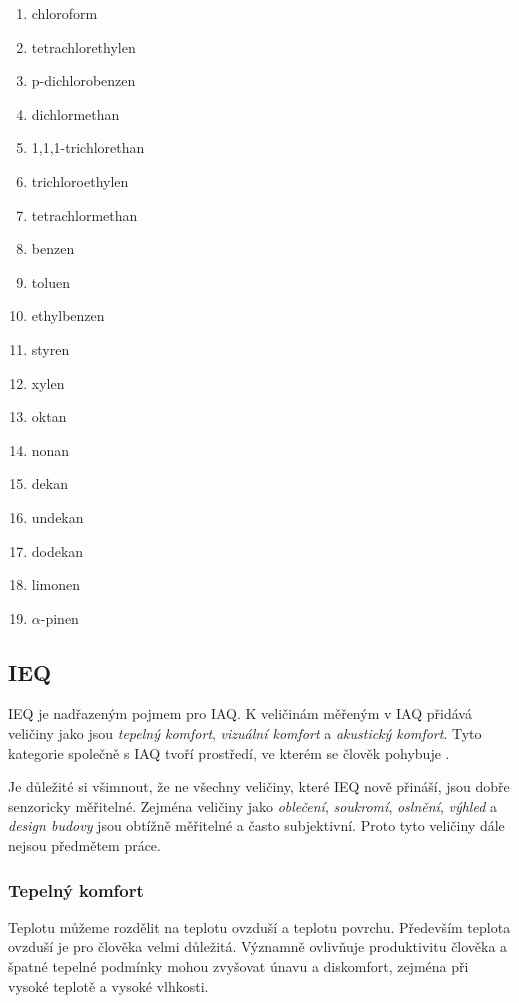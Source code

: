 \begin{enumerate}
	\item chloroform
	\item tetrachlorethylen
	\item p-dichlorobenzen
	\item dichlormethan
	\item 1,1,1-trichlorethan
	\item trichloroethylen
	\item tetrachlormethan
	\item benzen
	\item toluen
	\item ethylbenzen
	\item styren
	\item xylen
	\item oktan
	\item nonan
	\item dekan
	\item undekan
	\item dodekan
	\item limonen
	\item $\alpha$-pinen
\end{enumerate}

\subsection{IEQ}
IEQ je nadřazeným pojmem pro IAQ. K veličinám měřeným v IAQ přidává veličiny jako jsou \textit{tepelný komfort}, \textit{vizuální komfort} a \textit{akustický komfort}. Tyto kategorie společně s IAQ tvoří prostředí, ve kterém se člověk pohybuje \parencite{dengImpactIndoorAir2024}.

Je důležité si všimnout, že ne všechny veličiny, které IEQ nově přináší, jsou dobře senzoricky měřitelné. Zejména veličiny jako \textit{oblečení}, \textit{soukromí}, \textit{oslnění}, \textit{výhled} a \textit{design budovy} jsou obtížně měřitelné a často subjektivní. Proto tyto veličiny dále nejsou předmětem práce.

\subsubsection{Tepelný komfort}
Teplotu můžeme rozdělit na teplotu ovzduší a teplotu povrchu. Především teplota ovzduší je pro člověka velmi důležitá. Významně ovlivňuje produktivitu člověka a špatné tepelné podmínky mohou zvyšovat únavu a diskomfort, zejména při vysoké teplotě a vysoké vlhkosti. \parencite{dengImpactIndoorAir2024} 

